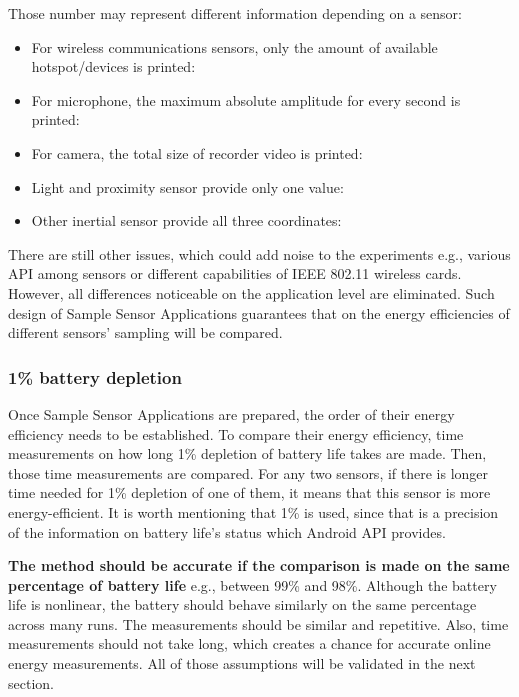 Those number may represent different information depending on a sensor:
\begin{itemize}
	\item For wireless communications sensors, only the amount of available hotspot/devices is printed: 
	\item For microphone, the maximum absolute amplitude for every second is printed:
	\item For camera, the total size of recorder video is printed:
	\item Light and proximity sensor provide only one value:
	\item Other inertial sensor provide all three coordinates:
\end{itemize}

There are still other issues, which could add noise to the experiments e.g., various API among sensors or different capabilities of IEEE 802.11 wireless cards. However, all differences noticeable on the application level are eliminated. Such design of Sample Sensor Applications guarantees that on the energy efficiencies of different sensors' sampling will be compared. 
				
\subsubsection{1\% battery depletion}	
\label{s:design:measurements:method}
\hspace{10pt} Once  Sample Sensor Applications are prepared, the order of their energy efficiency needs to be established. To compare their energy efficiency, time measurements on how long 1\% depletion of battery life takes are made. Then, those time measurements are compared. For any two sensors, if there is longer time needed for 1\% depletion of one of them, it means that this sensor is more energy-efficient. It is worth mentioning that 1\% is used, since that is a precision of the information on battery life's status which Android API provides.

\textbf{The method should be accurate if the comparison is made on the same percentage of battery life} e.g., between 99\% and 98\%. Although the battery life is nonlinear, the battery should behave similarly on the same percentage across many runs. The measurements should be similar and repetitive. Also, time measurements should not take long, which creates a chance for accurate online energy measurements. All of those assumptions will be validated in the next section.

